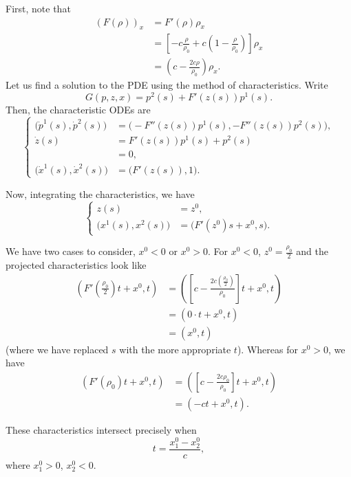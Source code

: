 \begin{solution*}
  First, note that
  \begin{align*}
    (F(\rho))_x
    &=F'(\rho)\rho_x\\
    &=\left[-c\frac{\rho}{\rho_0}+c\left(1-\frac{\rho}{\rho_0}\right)\right]\rho_x\\
    &=\left(c-\frac{2c\rho}{\rho_0}\right)\rho_x.
  \end{align*}
  Let us find a solution to the PDE using the method of
  characteristics. Write
  \[
    G(p,z,x)=p^2(s)+F'(z(s))p^1(s).
  \]
  Then, the characteristic ODEs are
  \[
    \left\{
      \begin{aligned}
        \bigl(\dot p^1(s),\dot p^2(s)\bigr)
        &=\bigl(-F''(z(s))p^1(s),-F''(z(s))p^2(s)\bigr),\\
        \dot z(s)
        &=F'(z(s))p^1(s)+p^2(s)\\
        &=0,\\
        \bigl(\dot x^1(s),\dot x^2(s)\bigr)
        &=\bigl(F'(z(s)),1\bigr).
      \end{aligned}
    \right.
  \]

  Now, integrating the characteristics, we have
  \[
    \left\{
      \begin{aligned}
         z(s)
        &=z^0,\\
        \bigl(x^1(s),x^2(s)\bigr)
        &=\bigl(F'(z^0)s+x^0,s\bigr).
      \end{aligned}
    \right.
  \]

  We have two cases to consider, \(x^0<0\) or \(x^0>0\). For \(x^0<0\),
  \(z^0=\frac{\rho_0}{2}\) and the projected characteristics look like
  \begin{align*}
    \left(
    F'(\frac{\rho_0}{2})t+x^0
    ,t\right)
    &=\left(
      \left[c-\frac{2c(\frac{\rho_0}{2})}{\rho_0}\right]t+x^0,t
      \right)\\
    &=(0\cdot t+x^0,t)\\
    &=(x^0,t)
  \end{align*}
  (where we have replaced \(s\) with the more appropriate \(t\)). Whereas
  for \(x^0>0\), we have
  \begin{align*}
    \left(
    F'(\rho_0)t+x^0
    ,t\right)
    &=\left(
       \left[c-\frac{2c\rho_0}{\rho_0}\right]t+x^0,t
      \right)\\
    &=(-ct+x^0,t).
  \end{align*}

  These characteristics intersect precisely when
  \[
    t=\frac{x_1^0-x_2^0}{c},
  \]
  where \(x_1^0>0\), \(x_2^0<0\).
\end{solution*}

